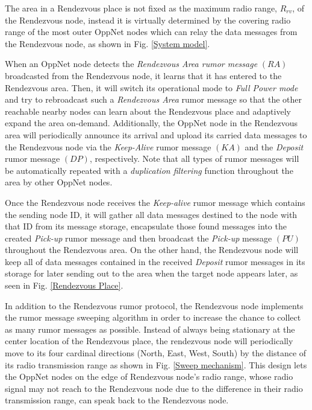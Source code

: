 The area in a Rendezvous place is not fixed as the maximum radio range, $R_{rv}$,  of the Rendezvous node, instead it is virtually determined by the covering radio range of the most outer OppNet nodes which can relay the data messages from the Rendezvous node, as shown in Fig. \ref{System model}.

When an OppNet node detects the \emph{Rendezvous Area rumor message} $(RA)$ broadcasted from the Rendezvous node, it learns that it has entered to the Rendezvous area.
%
Then, it will switch its operational mode to \emph{Full Power mode} and try to rebroadcast such a \emph{Rendezvous Area }rumor message so that the other reachable nearby nodes can learn about the Rendezvous place and adaptively expand the area on-demand.
%
Additionally, the OppNet node in the Rendezvous area will periodically announce its arrival and upload its carried data messages to the Rendezvous node via the \emph{Keep-Alive} rumor message $(KA)$ and the \emph{Deposit} rumor message $(DP)$, respectively.
%
Note that all types of rumor messages will be automatically repeated with a \emph{duplication filtering} function throughout the area by other OppNet nodes.

Once the Rendezvous node receives the \emph{Keep-alive} rumor message which contains the sending node ID, it will gather all data messages destined to the node with that ID from its message storage, encapsulate those found messages into the created \emph{Pick-up} rumor message and then broadcast the \emph{Pick-up} message $(PU)$ throughout the Rendezvous area.
%
On the other hand, the Rendezvous node will keep all of data messages contained in the received \emph{Deposit} rumor messages in its storage for later sending out to the area when the target node appears later, as seen in Fig. \ref{Rendezvous Place}. 

In addition to the Rendezvous rumor protocol, the Rendezvous node implements the rumor message sweeping algorithm in order to increase the chance to collect as many rumor messages as possible.
%
Instead of always being stationary at the center location of the Rendezvous place, the rendezvous node will periodically move to its four cardinal directions (North, East, West, South) by the distance of its radio transmission range as shown in Fig. \ref{Sweep mechanism}.
%
This design lets the OppNet nodes on the edge of Rendezvous node's radio range, whose radio signal may not reach to the Rendezvous node due to the difference in their radio transmission range, can speak back to the Rendezvous node.

